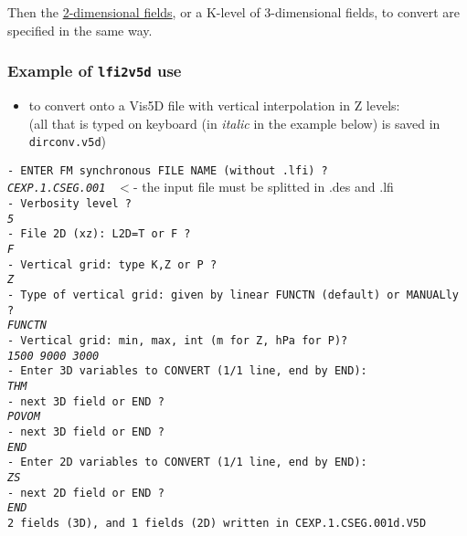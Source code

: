Then the \underline{2-dimensional fields},
or a K-level of 3-dimensional fields,
to convert are specified in the same way.

\subsubsection{Example of {\tt lfi2v5d} use}
\begin{itemize}
\item to convert onto a Vis5D file with vertical interpolation in Z levels:\\
(all that is typed on keyboard (in {\it italic} in the example below)
is saved in {\tt dirconv.v5d})
\end{itemize}
\small
{\tt - ENTER FM synchronous FILE NAME (without .lfi) ?}  \\
{\tt\it CEXP.1.CSEG.001 } \hspace{3.5cm} $<$- the input file must be splitted in .des and .lfi \\
{\tt - Verbosity level ?}  \\
{\tt\it 5 }  \\
{\tt - File 2D (xz): L2D=T or F ?}  \\
{\tt\it F }  \\
{\tt - Vertical grid: type K,Z or P ?}  \\
{\tt\it Z }  \\
{\tt - Type of vertical grid: given by linear FUNCTN (default) or MANUALly ?} \\
{\tt\it FUNCTN }  \\
{\tt - Vertical grid: min, max, int (m for Z, hPa for P)?} \\
{\tt\it 1500 9000 3000 }  \\
{\tt - Enter 3D variables to CONVERT (1/1 line, end by END): }\\
{\tt\it THM }  \\
{\tt - next 3D field or END ? }\\
{\tt\it POVOM }  \\
{\tt - next 3D field or END ? }\\
{\tt\it END }\\
{\tt - Enter 2D variables to CONVERT (1/1 line, end by END): }\\
{\tt\it ZS }  \\
{\tt - next 2D field or END ? }\\
{\tt\it END }\\
{\tt 2 fields (3D), and   1 fields (2D) written in CEXP.1.CSEG.001d.V5D }\\


